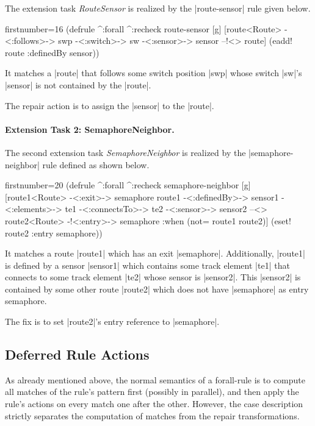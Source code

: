 \documentclass[submission]{eptcs}
\newcommand{\code}{\clojureinline}
\begin{document}
The extension task \emph{RouteSensor} is realized by the \code|route-sensor|
rule given below.

\begin{clojurecode*}{firstnumber=16}
(defrule ^:forall ^:recheck route-sensor [g]
  [route<Route> -<:follows>-> swp -<:switch>-> sw
   -<:sensor>-> sensor --!<> route]
  (eadd! route :definedBy sensor))
\end{clojurecode*}

It matches a \code|route| that follows some switch position \code|swp| whose
switch \code|sw|'s \code|sensor| is not contained by the \code|route|.

The repair action is to assign the \code|sensor| to the \code|route|.


\paragraph{Extension Task 2: SemaphoreNeighbor.}

The second extension task \emph{SemaphoreNeighbor} is realized by the
\code|semaphore-neighbor| rule defined as shown below.

\begin{clojurecode*}{firstnumber=20}
(defrule ^:forall ^:recheck semaphore-neighbor [g]
  [route1<Route> -<:exit>-> semaphore
   route1 -<:definedBy>-> sensor1 -<:elements>-> te1
   -<:connectsTo>-> te2 -<:sensor>-> sensor2
   --<> route2<Route> -!<:entry>-> semaphore
   :when (not= route1 route2)]
  (eset! route2 :entry semaphore))
\end{clojurecode*}

It matches a route \code|route1| which has an exit \code|semaphore|.
Additionally, \code|route1| is defined by a sensor \code|sensor1| which
contains some track element \code|te1| that connects to some track element
\code|te2| whose sensor is \code|sensor2|.  This \code|sensor2| is contained by
some other route \code|route2| which does not have \code|semaphore| as entry
semaphore.

The fix is to set \code|route2|'s entry reference to \code|semaphore|.


\subsection{Deferred Rule Actions}
\label{sec:deferred-actions}

As already mentioned above, the normal semantics of a forall-rule is to compute
all matches of the rule's pattern first (possibly in parallel), and then apply
the rule's actions on every match one after the other.  However, the case
description strictly separates the computation of matches from the repair
transformations.
\end{document}
